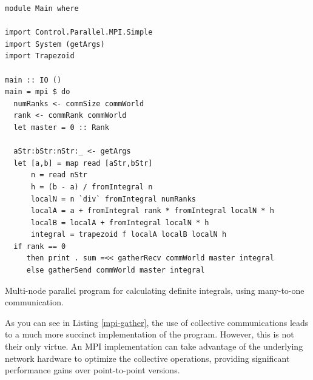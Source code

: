 \documentclass{tmr}
\begin{document}



\begin{listing}
\begin{Verbatim}
module Main where

import Control.Parallel.MPI.Simple
import System (getArgs)
import Trapezoid

main :: IO ()
main = mpi $ do
  numRanks <- commSize commWorld
  rank <- commRank commWorld
  let master = 0 :: Rank

  aStr:bStr:nStr:_ <- getArgs
  let [a,b] = map read [aStr,bStr]
      n = read nStr
      h = (b - a) / fromIntegral n
      localN = n `div` fromIntegral numRanks
      localA = a + fromIntegral rank * fromIntegral localN * h
      localB = localA + fromIntegral localN * h
      integral = trapezoid f localA localB localN h
  if rank == 0
     then print . sum =<< gatherRecv commWorld master integral
     else gatherSend commWorld master integral
\end{Verbatim}
\caption{Multi-node parallel program for calculating definite
  integrals, using many-to-one communication. \label{mpi-gather}}
\end{listing}

As you can see in Listing \ref{mpi-gather},
the use of collective communications
leads to a much more succinct implementation of the program.
However, this is not their only virtue. An MPI implementation
can take advantage of the underlying network hardware to optimize
the collective operations, providing significant performance
gains over point-to-point versions.
\end{document}
